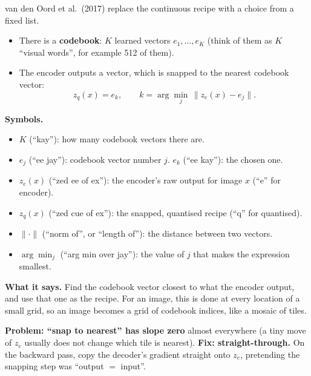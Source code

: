 van den Oord et al.\ (2017) replace the continuous recipe with a choice from a fixed list.
\begin{itemize}[leftmargin=1.5em]
\item There is a \textbf{codebook}: $K$ learned vectors $e_1, \dots, e_K$ (think of them as $K$ ``visual words'', for example 512 of them).
\item The encoder outputs a vector, which is snapped to the nearest codebook vector:
\[
z_q(x) = e_k, \qquad k = \arg\min_{j}\,\big\| z_e(x) - e_j \big\|.
\]
\end{itemize}
\textbf{Symbols.}
\begin{itemize}[leftmargin=1.5em, itemsep=0pt]
\item $K$ (``kay''): how many codebook vectors there are.
\item $e_j$ (``ee jay''): codebook vector number $j$. $e_k$ (``ee kay''): the chosen one.
\item $z_e(x)$ (``zed ee of ex''): the encoder's raw output for image $x$ (``e'' for encoder).
\item $z_q(x)$ (``zed cue of ex''): the snapped, quantised recipe (``q'' for quantised).
\item $\|\cdot\|$ (``norm of'', or ``length of''): the distance between two vectors.
\item $\arg\min_j$ (``arg min over jay''): the value of $j$ that makes the expression smallest.
\end{itemize}
\textbf{What it says.} Find the codebook vector closest to what the encoder output, and use that one as the recipe. For an image, this is done at every location of a small grid, so an image becomes a grid of codebook indices, like a mosaic of tiles.

\textbf{Problem: ``snap to nearest'' has slope zero} almost everywhere (a tiny move of $z_e$ usually does not change which tile is nearest). \textbf{Fix: straight-through.} On the backward pass, copy the decoder's gradient straight onto $z_e$, pretending the snapping step was ``output $=$ input''.

